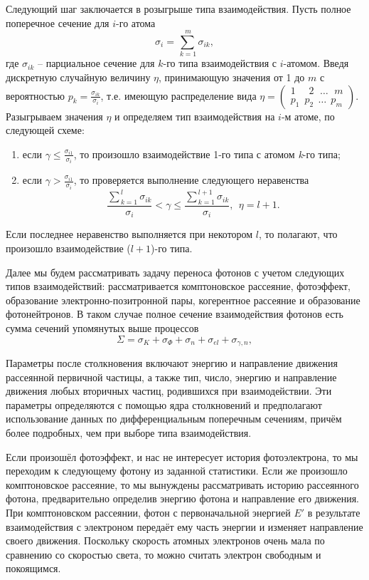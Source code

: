\documentclass[
11pt,
master, %
subf, %
href, %
colorlinks=true, %
]{disser}
\begin{document}
Следующий шаг заключается в розыгрыше типа взаимодействия. Пусть полное поперечное сечение для  $i$-го атома
\[\sigma _{i} =\sum _{\, k=1}^{\, m}\sigma _{ik}  ,\]
где $\sigma _{ik} $ -- парциальное сечение для $k$-го типа взаимодействия с $i$-атомом. Введя дискретную случайную величину $\eta $, принимающую значения от 1 до $m$ с вероятностью $p_{k} =\frac{\sigma _{ik} }{\sigma _{i} } $, т.е. имеющую распределение вида  $\eta =\left(\begin{array}{l} {1\, \quad \, 2\, \; \, \ldots \, \, \; m} \\ {p_{1} \, \, \, p_{2} \; \, \ldots \, \; p_{m} } \end{array}\right)$.  Разыгрываем значения $\eta $ и определяем тип  взаимодействия на $i$-м атоме, по следующей схеме:
\begin{enumerate}
\item  если  $\gamma \le \frac{\sigma _{i1} }{\sigma _{i} } $, то произошло взаимодействие 1-го типа с атомом \textit{k}-го типа;

\item  если  $\gamma >\frac{\sigma _{i1} }{\sigma _{i} } $, то проверяется выполнение следующего неравенства
$$
\frac{\sum _{\, k=1}^{\, l}\sigma _{ik}  }{\sigma _{i} } <\gamma \le \frac{\sum _{\, k=1}^{\, l+1}\sigma _{ik}  }{\sigma _{i} } , ~~ \eta =l+1.
$$
\end{enumerate}

Если последнее неравенство выполняется при некотором $l$, то полагают, что произошло взаимодействие ($l+1$)-го типа.

Далее мы будем рассматривать задачу переноса фотонов с учетом следующих типов взаимодействий: рассматривается комптоновское рассеяние, фотоэффект, образование электронно-позитронной пары, когерентное рассеяние и образование фотонейтронов. В таком случае полное сечение взаимодействия фотонов есть сумма сечений упомянутых выше процессов
$$
\Sigma =\sigma _{K} +\sigma _{\Phi} +\sigma _{n} +\sigma _{el} +\sigma _{\gamma ,n} ,
$$

Параметры после столкновения включают энергию и направление движения рассеянной первичной частицы, а также тип, число, энергию и направление движения любых вторичных частиц, родившихся при взаимодействии. Эти параметры определяются с помощью ядра столкновений и предполагают использование данных по дифференциальным поперечным сечениям, причём более подробных, чем при выборе типа взаимодействия.

Если произошёл фотоэффект, и нас не интересует история фотоэлектрона, то мы переходим к следующему фотону из заданной статистики. Если же произошло комптоновское рассеяние, то мы вынуждены рассматривать историю рассеянного фотона, предварительно определив энергию фотона и направление его движения. При комптоновском рассеянии, фотон с первоначальной энергией $E'$ в результате взаимодействия с электроном передаёт ему часть энергии и изменяет направление своего движения. Поскольку скорость атомных электронов очень мала по сравнению со скоростью света, то можно считать электрон свободным и покоящимся.
\end{document}
